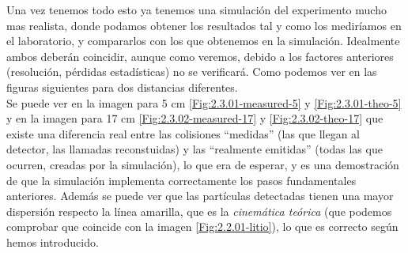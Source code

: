 \documentclass[12pt,a4paper]{article}
\numberwithin{equation}{section}
\numberwithin{figure}{section}
\begin{document}
Una vez tenemos todo esto ya tenemos una simulación del experimento mucho mas realista, donde podamos obtener los resultados tal y como los mediríamos en el laboratorio, y compararlos con los que obtenemos en la simulación. Idealmente ambos deberán coincidir, aunque como veremos, debido a los factores anteriores (resolución, pérdidas estadísticas) no se verificará. Como podemos ver en las figuras siguientes para dos distancias diferentes. \\


Se puede ver en la imagen para 5 cm \ref{Fig:2.3.01-measured-5} y \ref{Fig:2.3.01-theo-5} y en la imagen  para 17 cm \ref{Fig:2.3.02-measured-17} y \ref{Fig:2.3.02-theo-17} que existe una diferencia real entre las colisiones ``medidas'' (las que llegan al detector, las llamadas reconstuidas) y las ``realmente emitidas'' (todas las que ocurren, creadas por la simulación), lo que era de esperar, y es una demostración de que la simulación implementa correctamente los pasos fundamentales anteriores. Además se puede ver que las partículas detectadas tienen una mayor dispersión respecto la línea amarilla, que es la {\it cinemática teórica} (que podemos comprobar que coincide con la imagen \ref{Fig:2.2.01-litio}), lo que es correcto según hemos introducido. \\
\end{document}
